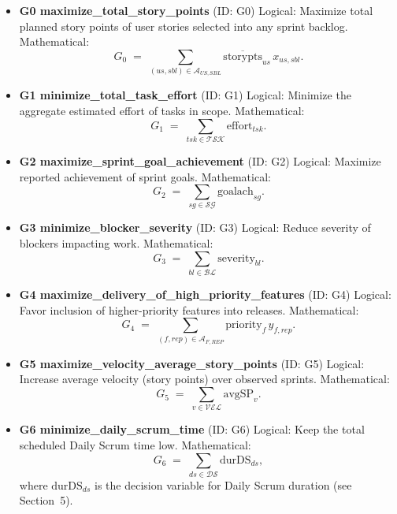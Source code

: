 \documentclass[11pt,a4paper]{article}
\begin{document}
\begin{itemize}
  \item \textbf{G0 maximize\_total\_story\_points} (ID: G0)\newline
  Logical: Maximize total planned story points of user stories selected into any sprint backlog.\newline
  Mathematical:
  \[
    G_{0} \;=\; \sum_{(us,sbl)\in \mathcal{A}_{US,SBL}} \overline{\text{storypts}}_{us}\, x_{us,sbl}.
  \]

  \item \textbf{G1 minimize\_total\_task\_effort} (ID: G1)\newline
  Logical: Minimize the aggregate estimated effort of tasks in scope.\newline
  Mathematical:
  \[
    G_{1} \;=\; \sum_{tsk\in\mathcal{TSK}} \text{effort}_{tsk}.
  \]

  \item \textbf{G2 maximize\_sprint\_goal\_achievement} (ID: G2)\newline
  Logical: Maximize reported achievement of sprint goals.\newline
  Mathematical:
  \[
    G_{2} \;=\; \sum_{sg\in\mathcal{SG}} \text{goalach}_{sg}.
  \]

  \item \textbf{G3 minimize\_blocker\_severity} (ID: G3)\newline
  Logical: Reduce severity of blockers impacting work.\newline
  Mathematical:
  \[
    G_{3} \;=\; \sum_{bl\in\mathcal{BL}} \text{severity}_{bl}.
  \]

  \item \textbf{G4 maximize\_delivery\_of\_high\_priority\_features} (ID: G4)\newline
  Logical: Favor inclusion of higher-priority features into releases.\newline
  Mathematical:
  \[
    G_{4} \;=\; \sum_{(f,rep)\in \mathcal{A}_{F,REP}} \text{priority}_{f}\, y_{f,rep}.
  \]

  \item \textbf{G5 maximize\_velocity\_average\_story\_points} (ID: G5)\newline
  Logical: Increase average velocity (story points) over observed sprints.\newline
  Mathematical:
  \[
    G_{5} \;=\; \sum_{v\in\mathcal{VEL}} \text{avgSP}_{v}.
  \]

  \item \textbf{G6 minimize\_daily\_scrum\_time} (ID: G6)\newline
  Logical: Keep the total scheduled Daily Scrum time low.\newline
  Mathematical:
  \[
    G_{6} \;=\; \sum_{ds\in\mathcal{DS}} \text{durDS}_{ds},
  \]
  where $\text{durDS}_{ds}$ is the decision variable for Daily Scrum duration (see Section~5).


\end{itemize}
\end{document}
